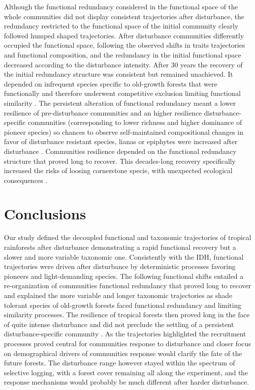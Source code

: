\documentclass[fleqn,10pt]{ArtEcoFoG} %
\theoremstyle{definition}
\theoremstyle{definition}
\theoremstyle{definition}
\theoremstyle{remark}
\begin{document}
Although the functional redundancy considered in the functional space of
the whole communities did not display consistent trajectories after
disturbance, the redundancy restricted to the functional space of the
initial community clearly followed humped shaped trajectories. After
disturbance communities differently occupied the functional space,
following the observed shifts in traits trajectories and functional
composition, and the redundancy in the initial functional space
decreased according to the disturbance intensity. After 30 years the
recovery of the initial redundancy structure was consistent but remained
unachieved. It depended on infrequent species specific to old-growth
forests that were functionally and therefore underwent competitive
exclusion limiting functional similarity
\citep{Chave2004, Mayfield2010}. The persistent alteration of functional
redundancy meant a lower resilience of pre-disturbance communities and
an higher resilience disturbance-specific communities (corresponding to
lower richness and higher dominance of pioneer species) so chances to
observe self-maintained compositional changes in favor of disturbance
resistant species, lianas or epiphytes were increased after disturbance
\citep{Haddad2008, Burslem2000, Martin2013}. Communities resilience
depended on the functional redundancy structure that proved long to
recover. This decades-long recovery specifically increased the risks of
loosing cornerstone specie, with unexpected ecological consequences
\citep{Jones1994, Chazdon2003a, Diaz2005, Gardner2007}.

\section{Conclusions}\label{conclusions}

Our study defined the decoupled functional and taxonomic trajectories of
tropical rainforests after disturbance demonstrating a rapid functional
recovery but a slower and more variable taxonomic one. Consistently with
the IDH, functional trajectories were driven after disturbance by
deterministic processes favoring pioneers and light-demanding species.
The following functional shifts entailed a re-organization of
communities functional redundancy that proved long to recover and
explained the more variable and longer taxonomic trajectories as shade
tolerant species of old-growth forests faced functional redundancy and
limiting similarity processes. The resilience of tropical forests then
proved long in the face of quite intense disturbance and did not
preclude the settling of a persistent disturbance-specific community
\citep{Gourlet-Fleury2005}. As the trajectories highlighted the
recruitment processes proved central for communities response to
disturbance and closer focus on demographical drivers of communities
response would clarify the fate of the future forests. The disturbance
range however stayed within the spectrum of selective logging, with a
forest cover remaining all along the experiment, and the response
mechanisms would probably be much different after harder disturbance.
\end{document}
